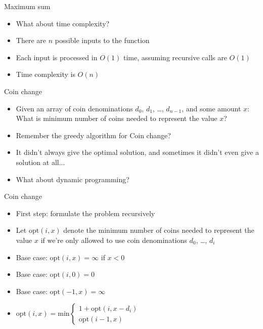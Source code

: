 \documentclass{beamer}
\begin{document}
\begin{frame}[plain]{Maximum sum}
    \vspace{20pt}
    \begin{itemize}
        \item What about time complexity?
        \vspace{5pt}
        \item There are $n$ possible inputs to the function
        \item Each input is processed in $O(1)$ time, assuming recursive calls are $O(1)$
        \item Time complexity is $O(n)$
    \end{itemize}
\end{frame}

\begin{frame}[plain]{Coin change}
    \vspace{20pt}

    \begin{itemize}
\item Given an array of coin denominations $d_0$, $d_1$, \ldots, $d_{n-1}$,
            and some amount $x$: What is minimum number of coins needed to
            represent the value $x$?

        \item Remember the greedy algorithm for Coin change?
        \item It didn't always give the optimal solution, and sometimes it didn't even give a solution at all...

        \vspace{10pt}
        \item What about dynamic programming?
    \end{itemize}
\end{frame}

\begin{frame}[plain]{Coin change}
    \begin{itemize}
        \item First step: formulate the problem recursively
        \vspace{20pt}
\item Let $\mathrm{opt}(i,x)$ denote the minimum number of coins needed to represent the value $x$ if we're only allowed to use coin denominations $d_0$, \ldots, $d_i$
        \vspace{10pt}
        \item Base case: $\mathrm{opt}(i,x) = \infty$ if $x < 0$
        \item Base case: $\mathrm{opt}(i,0) = 0$
        \item Base case: $\mathrm{opt}(-1,x) = \infty$
        \vspace{10pt}
\item $\mathrm{opt}(i,x) = \mathrm{min} \left\{
	\begin{array}{l}
        1 + \mathrm{opt}(i, x - d_i) \\
        \mathrm{opt}(i-1, x)
	\end{array}
\right.$
    \end{itemize}
\end{frame}
\end{document}
